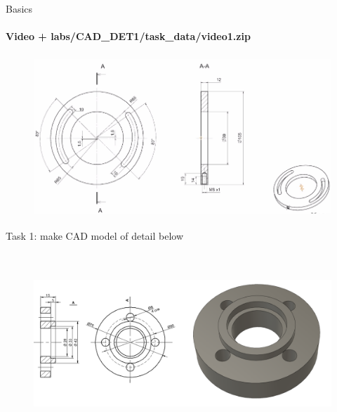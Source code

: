 \documentclass[aspectratio=169]{beamer}
\begin{document}
\begin{frame}[t]{Basics}
    \framesubtitle{Video + labs/CAD\_DET1/task\_data/video1.zip}
    \vspace{-0.6cm}
    \begin{figure}[H]
        \href{https://disk.yandex.ru/i/osJBruJtY83Crw}{
            \centering\includegraphics[height=6cm,width=1\textwidth,keepaspectratio]{resources/task_0.png}}
        \label{fig:1}
    \end{figure}
\end{frame}

\begin{frame}[t]{Task 1: make CAD model of detail below}
\framesubtitle{}
    \vspace{-0.6cm}
    \begin{figure}[H]
        \centering\includegraphics[height=6.5cm,width=1\textwidth,keepaspectratio]{resources/task_1.png}
        \label{fig:resources/task_1.png}
    \end{figure}
\end{frame}
\end{document}
